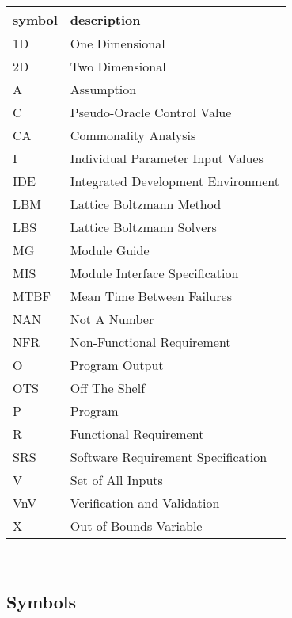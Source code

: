 \documentclass[12pt, titlepage]{article}
\begin{document}
\renewcommand{\arraystretch}{1.2}
\begin{tabular}{l l} 
  \toprule		
  \textbf{symbol} & \textbf{description}\\
  \midrule 
  1D & One Dimensional\\
  2D & Two Dimensional\\
  A & Assumption\\
  C & Pseudo-Oracle Control Value\\
  CA & Commonality Analysis\\
  I & Individual Parameter Input Values\\
  IDE & Integrated Development Environment\\
  LBM & Lattice Boltzmann Method\\
  LBS & Lattice Boltzmann Solvers\\
  MG & Module Guide\\
  MIS & Module Interface Specification\\
  MTBF & Mean Time Between Failures\\
  NAN & Not A Number\\
  NFR & Non-Functional Requirement\\
  O & Program Output\\
  OTS & Off The Shelf\\
  P & Program\\
  R & Functional Requirement\\
  SRS & Software Requirement Specification\\
  V & Set of All Inputs\\
  VnV & Verification and Validation\\
  X & Out of Bounds Variable\\
  \bottomrule
\end{tabular}\\

\newpage

\subsection{Symbols}
\end{document}

